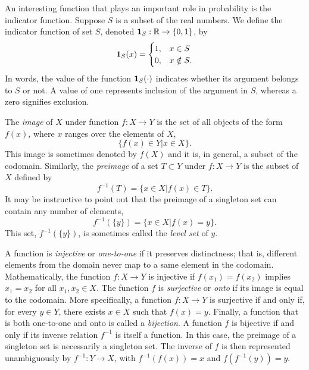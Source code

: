 \begin{example}
An interesting function that plays an important role in probability is the indicator function.
Suppose $S$ is a subset of the real numbers.
We define the indicator function of set $S$, denoted $\mathbf{1}_S: \mathbb{R} \rightarrow \{ 0, 1 \}$, by
\begin{equation*}
\mathbf{1}_S (x) = \begin{cases} 1, & x \in S\\
0, & x \notin S . \end{cases}
\end{equation*}
In words, the value of the function $\mathbf{1}_S (\cdot)$ indicates whether its argument belongs to $S$ or not.
A value of one represents inclusion of the argument in $S$, whereas a zero signifies exclusion.
\end{example}

The \emph{image} of $X$ under function $f: X \rightarrow Y$ is the set of all objects of the form $f(x)$, where $x$ ranges over the elements of $X$,
\begin{equation*}
\{ f(x) \in Y | x \in X \} .
\end{equation*}
This image is sometimes denoted by $f(X)$ and it is, in general, a subset of the codomain.
Similarly, the \emph{preimage} of a set $T \subset Y$ under $f: X \rightarrow Y$ is the subset of $X$ defined by
\begin{equation*}
f^{-1} (T) = \{ x \in X | f(x) \in T \} .
\end{equation*}
It may be instructive to point out that the preimage of a singleton set can contain any number of elements,
\begin{equation*}
f^{-1} (\{ y \}) = \{ x \in X | f(x) = y \} .
\end{equation*}
This set, $f^{-1} (\{ y \})$, is sometimes called the \emph{level set} of $y$.

A function is \emph{injective} or \emph{one-to-one} if it preserves distinctness;
that is, different elements from the domain never map to a same element in the codomain.
Mathematically, the function $f: X \rightarrow Y$ is injective if $f(x_1) = f(x_2)$ implies $x_1 = x_2$ for all $x_1, x_2 \in X$.
The function $f$ is \emph{surjective} or \emph{onto} if its image is equal to the codomain.
More specifically, a function $f: X \rightarrow Y$ is surjective if and only if, for every $y \in Y$, there exists $x \in X$ such that $f(x) = y$.
Finally, a function that is both one-to-one and onto is called a \emph{bijection}.
A function $f$ is bijective if and only if its inverse relation $f^{-1}$ is itself a function.
In this case, the preimage of a singleton set is necessarily a singleton set.
The inverse of $f$ is then represented unambiguously by $f^{-1}: Y \rightarrow X$,
with $f^{-1} (f(x)) = x$ and $f (f^{-1} (y)) = y$.


